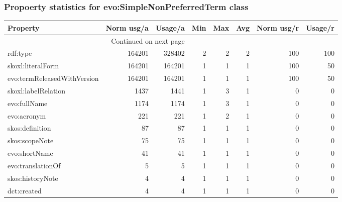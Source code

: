 \documentclass[10pt,a4paper,titlepage,final]{article}
\begin{document}
\subsubsection{Propoerty statistics for evo:SimpleNonPreferredTerm class}
\begin{longtable}{lrrrrrrr}
\toprule
                    Property &  Norm usg/a &  Usage/a &  Min &  Max &  Avg &  Norm usg/r &  Usage/r \\
\midrule
\endhead
\midrule
\multicolumn{3}{r}{{Continued on next page}} \\
\midrule
\endfoot

\bottomrule
\endlastfoot
                    rdf:type &      164201 &   328402 &    2 &    2 &    2 &         100 &      100 \\
           skoxl:literalForm &      164201 &   164201 &    1 &    1 &    1 &         100 &       50 \\
 evo:termReleasedWithVersion &      164201 &   164201 &    1 &    1 &    1 &         100 &       50 \\
         skoxl:labelRelation &        1437 &     1441 &    1 &    3 &    1 &           0 &        0 \\
                evo:fullName &        1174 &     1174 &    1 &    3 &    1 &           0 &        0 \\
                 evo:acronym &         221 &      221 &    1 &    2 &    1 &           0 &        0 \\
             skos:definition &          87 &       87 &    1 &    1 &    1 &           0 &        0 \\
              skos:scopeNote &          75 &       75 &    1 &    1 &    1 &           0 &        0 \\
               evo:shortName &          41 &       41 &    1 &    1 &    1 &           0 &        0 \\
           evo:translationOf &           5 &        5 &    1 &    1 &    1 &           0 &        0 \\
            skos:historyNote &           4 &        4 &    1 &    1 &    1 &           0 &        0 \\
                 dct:created &           4 &        4 &    1 &    1 &    1 &           0 &        0 \\
\end{longtable}
\end{document}
